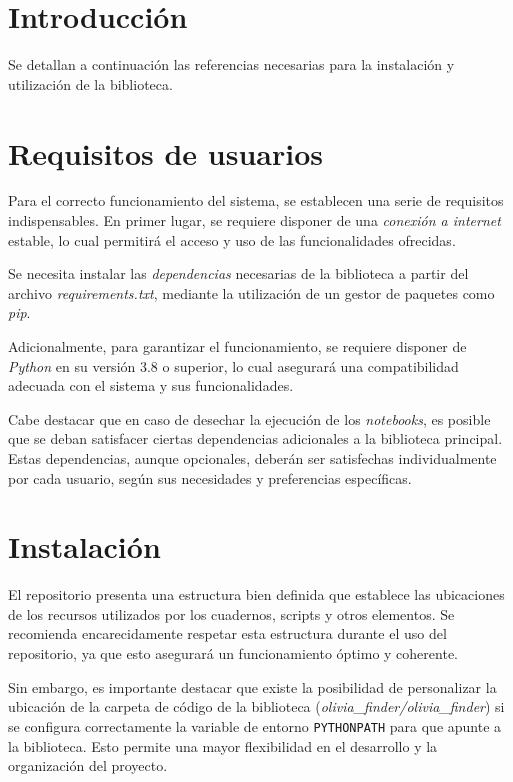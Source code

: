 
\section{Introducción}

Se detallan a continuación las referencias necesarias para la instalación y utilización de la biblioteca.

\section{Requisitos de usuarios}

Para el correcto funcionamiento del sistema, se establecen una serie de requisitos indispensables.
En primer lugar, se requiere disponer de una \textit{conexión a internet} estable, lo cual permitirá el
acceso y uso de las funcionalidades ofrecidas.

Se necesita instalar las \textit{dependencias} necesarias de la biblioteca a partir del archivo \textit{requirements.txt},
mediante la utilización de un gestor de paquetes como \textit{pip}.

Adicionalmente, para garantizar el funcionamiento, se requiere disponer de \textit{Python} en su versión
3.8 o superior, lo cual asegurará una compatibilidad adecuada con el sistema y sus funcionalidades.

Cabe destacar que en caso de desechar la ejecución de los \textit{notebooks}, es posible que se deban
satisfacer ciertas dependencias adicionales a la biblioteca principal. Estas dependencias, aunque opcionales,
deberán ser satisfechas individualmente por cada usuario, según sus necesidades y preferencias específicas.

\section{Instalación}

El repositorio presenta una estructura bien definida que establece las ubicaciones de los recursos utilizados por los cuadernos,
scripts y otros elementos. Se recomienda encarecidamente respetar esta estructura durante el uso del repositorio, ya que esto
asegurará un funcionamiento óptimo y coherente.

Sin embargo, es importante destacar que existe la posibilidad de personalizar la ubicación de la carpeta de código de la
biblioteca (\textit{olivia\_finder/olivia\_finder}) si se configura correctamente la variable de entorno \texttt{PYTHONPATH}
para que apunte a la biblioteca. Esto permite una mayor flexibilidad en el desarrollo y la organización del proyecto.

